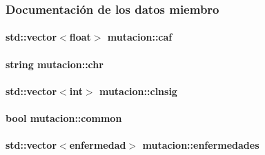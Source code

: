 \subsubsection{Documentación de los datos miembro}
\hypertarget{classmutacion_aef3fe46b6a2d10e3993703ebd5d5be5f}{
\paragraph[{caf}]{\setlength{\rightskip}{0pt plus 5cm}std\-::vector$<$float$>$ mutacion\-::caf\hspace{0.3cm}{\ttfamily [private]}}}\label{classmutacion_aef3fe46b6a2d10e3993703ebd5d5be5f}
\hypertarget{classmutacion_a57651966b952f782240ff9cff72c5d2f}{
\paragraph[{chr}]{\setlength{\rightskip}{0pt plus 5cm}string mutacion\-::chr\hspace{0.3cm}{\ttfamily [private]}}}\label{classmutacion_a57651966b952f782240ff9cff72c5d2f}
\hypertarget{classmutacion_a0d029eee6925649df15081b780c12e37}{
\paragraph[{clnsig}]{\setlength{\rightskip}{0pt plus 5cm}std\-::vector$<$int$>$ mutacion\-::clnsig\hspace{0.3cm}{\ttfamily [private]}}}\label{classmutacion_a0d029eee6925649df15081b780c12e37}
\hypertarget{classmutacion_a6dabfef6167d64030f095887b15f65dd}{
\paragraph[{common}]{\setlength{\rightskip}{0pt plus 5cm}bool mutacion\-::common\hspace{0.3cm}{\ttfamily [private]}}}\label{classmutacion_a6dabfef6167d64030f095887b15f65dd}
\hypertarget{classmutacion_ac8cca92dea1ab6fb9c193eed55a5ad28}{
\paragraph[{enfermedades}]{\setlength{\rightskip}{0pt plus 5cm}std\-::vector$<${\bf enfermedad}$>$ mutacion\-::enfermedades\hspace{0.3cm}{\ttfamily [private]}}}\label{classmutacion_ac8cca92dea1ab6fb9c193eed55a5ad28}
